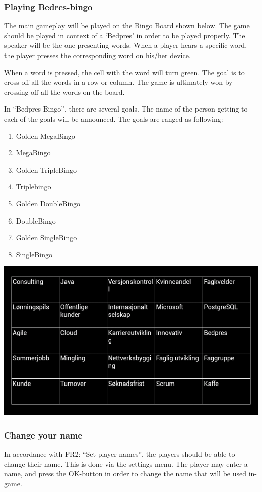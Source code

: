 \subsubsection{Playing Bedres-bingo}
The main gameplay will be played on the Bingo Board shown below. The game
should be played in context of a `Bedpres' in order to be played properly.
The speaker will be the one presenting words. When a player hears a specific
word, the player presses the corresponding word on his/her device.

When a word is pressed, the cell with the word will turn green. The goal is to
cross off all the words in a row or column. The game is ultimately won by
crossing off all the words on the board.

In ``Bedpres-Bingo'', there are several goals. The name of the person
getting to each of the goals will be announced.
The goals are ranged as following:
\begin{enumerate}
	\item{Golden MegaBingo}
	\item{MegaBingo}
	\item{Golden TripleBingo}
	\item{Triplebingo}
	\item{Golden DoubleBingo}
	\item{DoubleBingo}
	\item{Golden SingleBingo}
	\item{SingleBingo}
\end{enumerate}


\begin{center}
\includegraphics[scale=0.6]{Pikks/maingame}
\end{center}

\subsubsection{Change your name}
In accordance with FR2: ``Set player names'', the players should be able to
change their name. This is done via the settings menu. The player may enter a
name, and press the OK-button in order to change the name that will be used
in-game.

